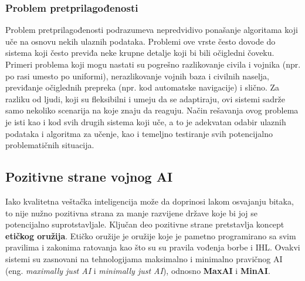 \documentclass[a4paper]{article}
\begin{document}
\subsubsection{Problem pretprilagođenosti}
\label{subsubsec: Problem pretprilagođenosti}
Problem pretprilagođenosti podrazumeva nepredvidivo ponašanje algoritama koji uče na osnovu nekih ulaznih podataka. Problemi ove vrste često dovode do sistema koji često previđa neke krupne detalje koji bi bili očigledni čoveku. Primeri problema koji mogu nastati su pogrešno razlikovanje civila i vojnika (npr. po rasi umesto po uniformi), nerazlikovanje vojnih baza i civilnih naselja, previđanje očiglednih prepreka (npr. kod automatske navigacije) i slično.
\newline
\newline
Za razliku od ljudi, koji su fleksibilni i umeju da se adaptiraju, ovi sistemi sadrže samo nekoliko scenarija na koje znaju da reaguju. Način rešavanja ovog problema je isti kao i kod svih drugih sistema koji uče, a to je adekvatan odabir ulaznih podataka i algoritma za učenje, kao i temeljno testiranje svih potencijalno problematičnih situacija.

\subsection{Pozitivne strane vojnog AI}
\label{subsec: Pozitivne strane vojnog AI}
Iako kvalitetna veštačka inteligencija može da doprinosi lakom osvajanju bitaka, to nije nužno pozitivna strana za manje razvijene države koje bi joj se potencijalno suprotstavljale. Ključan deo pozitivne strane pretstavlja koncept \textbf{etičkog oružija}. Etičko oružije je oružije koje je pametno programirano sa svim pravilima i zakonima ratovanja kao što su su pravila vođenja borbe i IHL. Ovakvi sistemi su zasnovani na tehnologijama maksimalno i minimalno pravičnog AI (eng. \textit{maximally just AI} i \textit{minimally just AI}), odnosno \textbf{MaxAI} i \textbf{MinAI}.
\end{document}
